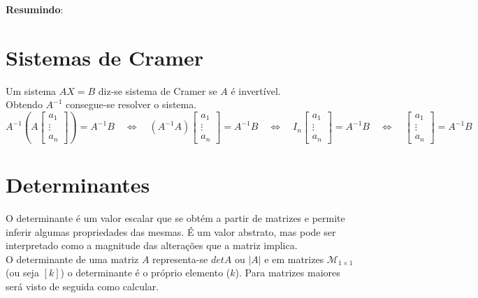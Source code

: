 \documentclass[]{report}
\begin{document}
{\textbf{Resumindo}:\\
}
\section{Sistemas de Cramer}
Um sistema $AX = B$ diz-se sistema de Cramer se $A$ é invertível.\\
Obtendo $A^{-1}$ consegue-se resolver o sistema.
$$A^{-1}\left(A \begin{bmatrix} a_1 \\ \vdots \\ a_n \end{bmatrix} \right) = A^{-1}B
\quad \Leftrightarrow \quad
\left(A^{-1}A\right) \begin{bmatrix} a_1 \\ \vdots \\ a_n \end{bmatrix} = A^{-1}B
\quad \Leftrightarrow \quad
I_n \begin{bmatrix} a_1 \\ \vdots \\ a_n \end{bmatrix} = A^{-1}B
\quad \Leftrightarrow \quad
\begin{bmatrix} a_1 \\ \vdots \\ a_n \end{bmatrix} = A^{-1}B
$$
\section{Determinantes}
O determinante é um valor escalar que se obtém a partir de matrizes e permite inferir algumas propriedades das mesmas. É um valor abstrato, mas pode ser interpretado como a magnitude das alterações que a matriz implica.\\
O determinante de uma matriz $A$ representa-se $det A$ ou $|A|$ e em matrizes $\mathcal{M}_{1 \times 1}$ (ou seja $[k]$) o determinante é o próprio elemento ($k$). Para matrizes maiores será visto de seguida como calcular.
\end{document}
